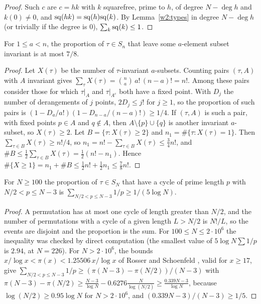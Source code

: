 \begin{proof}
Such $c$ are $c=hk$ with $k$ squarefree, prime to $h$, of degree $N-\deg h$ and $k(0)\ne0$, and $\mathrm{sq}(hk)=\mathrm{sq}(h)\mathrm{sq}(k)$. By Lemma~\ref{w2:types} in degree $N-\deg h$ (or trivially if the degree is $0$), $\sum_k\mathrm{sq}(k)\le1$.
\end{proof}

\begin{lemma}\label{w2:78}
For $1\le a<n$, the proportion of $\tau\in S_n$ that leave some $a$-element subset invariant is at most $7/8$.
\end{lemma}

\begin{proof}
Let $X(\tau)$ be the number of $\tau$-invariant $a$-subsets. Counting pairs $(\tau,A)$ with $A$ invariant gives $\sum_\tau X(\tau)=\binom na\,a!\,(n-a)!=n!$. Among these pairs consider those for which $\tau|_A$ and $\tau|_{A^c}$ both have a fixed point. With $D_j$ the number of derangements of $j$ points, $2D_j\le j!$ for $j\ge1$, so the proportion of such pairs is $(1-D_a/a!)(1-D_{n-a}/(n-a)!)\ge1/4$. If $(\tau,A)$ is such a pair, with fixed points $p\in A$ and $q\notin A$, then $A\setminus\{p\}\cup\{q\}$ is another invariant $a$-subset, so $X(\tau)\ge2$. Let $B=\{\tau:X(\tau)\ge2\}$ and $n_1=\#\{\tau:X(\tau)=1\}$. Then $\sum_{\tau\in B}X(\tau)\ge n!/4$, so $n_1=n!-\sum_{\tau\in B}X(\tau)\le\tfrac34n!$, and $\#B\le\tfrac12\sum_{\tau\in B}X(\tau)=\tfrac12(n!-n_1)$. Hence $\#\{X\ge1\}=n_1+\#B\le\tfrac12n!+\tfrac12n_1\le\tfrac78n!$.
\end{proof}

\begin{lemma}\label{w2:primecycles}
For $N\ge100$ the proportion of $\tau\in S_N$ that have a cycle of prime length $p$ with $N/2<p\le N-3$ is $\sum_{N/2<p\le N-3}1/p\ge1/(5\log N)$.
\end{lemma}

\begin{proof}
A permutation has at most one cycle of length greater than $N/2$, and the number of permutations with a cycle of a given length $L>N/2$ is $N!/L$, so the events are disjoint and the proportion is the sum. For $100\le N\le2\cdot10^6$ the inequality was checked by direct computation (the smallest value of $5\log N\sum1/p$ is $2.94$, at $N=226$). For $N>2\cdot10^6$, the bounds $x/\log x<\pi(x)<1.25506\,x/\log x$ of Rosser and Schoenfeld \cite[Cor.~1]{w2rs}, valid for $x\ge17$, give $\sum_{N/2<p\le N-3}1/p\ge(\pi(N-3)-\pi(N/2))/(N-3)$ with $\pi(N-3)-\pi(N/2)\ge\frac{N-3}{\log N}-0.6276\frac{N}{\log(N/2)}\ge\frac{0.339N-3}{\log N}$, because $\log(N/2)\ge0.95\log N$ for $N>2\cdot10^6$, and $(0.339N-3)/(N-3)\ge1/5$.
\end{proof}

